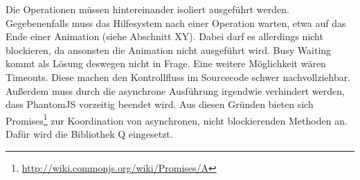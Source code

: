 \documentclass[
	headsepline,
	footsepline,
	fontsize=12pt,
	bibliography=totoc
]{scrbook}
\begin{document}
Die Operationen müssen hintereinander isoliert ausgeführt werden. Gegebenenfalls muss das Hilfesystem nach einer Operation warten, etwa auf das Ende einer Animation (siehe Abschnitt XY). Dabei darf es allerdings nicht blockieren, da ansonsten die Animation nicht ausgeführt wird. Busy Waiting kommt als Lösung deswegen nicht in Frage. Eine weitere Möglichkeit wären Timeouts. Diese machen den Kontrollfluss im Sourcecode schwer nachvollziehbar. Außerdem muss durch die asynchrone Ausführung irgendwie verhindert werden, dass PhantomJS vorzeitig beendet wird. Aus diesen Gründen bieten sich Promises\footnote{\url{http://wiki.commonjs.org/wiki/Promises/A}} zur Koordination von asynchronen, nicht blockierenden Methoden an. Dafür wird die Bibliothek Q eingesetzt.

\printbibliography[title=Literaturverzeichnis]

\end{document}
